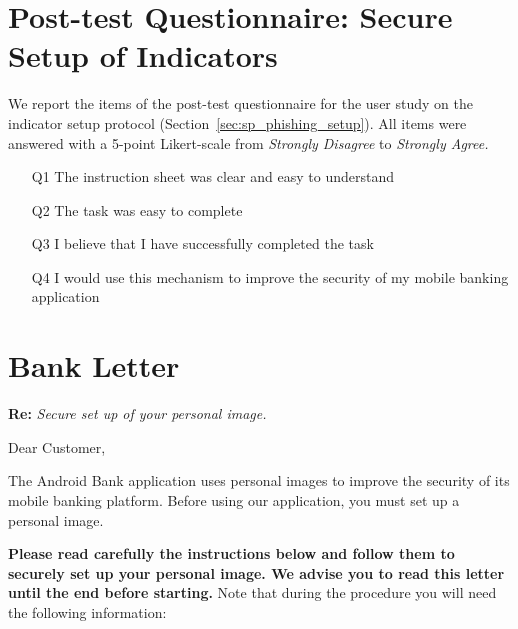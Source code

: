 \section{Post-test Questionnaire: Secure Setup of Indicators}
\label{app:sp_phishing_posttestII}
We report the items of the post-test questionnaire for the user study on the indicator setup protocol (Section~\ref{sec:sp_phishing_setup}).
All items were answered with a 5-point Likert-scale from \emph{Strongly Disagree} to \emph{Strongly Agree.}

\begin{itemize}[noitemsep]
\item[Q1] The instruction sheet was clear and easy to understand
\item[Q2] The task was easy to complete
\item[Q3] I believe that I have successfully completed the task
\item[Q4] I would use this mechanism to improve the security of my mobile banking application
\end{itemize}

\newpage

\section{Bank Letter}
\label{app:sp_phishing_bankletter}


\noindent\textbf{Re:} \textit{Secure set up of your personal image.}
\vspace{0.7cm}

Dear Customer,
\vspace{0.5cm}

The Android Bank application uses personal images to improve the security of its mobile banking
platform. Before using our application, you must set up a personal image.
\bigskip

\textbf{Please read carefully the instructions below and follow them to securely set up your personal image.
We advise you to read this letter until the end before starting.}
Note that during the procedure you will need the following information:

